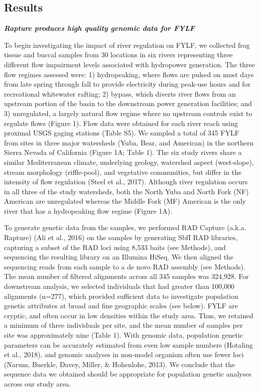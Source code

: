 \documentclass[twoside,12pt,final]{ucthesis-CA2012}
\begin{document}
\begin{ucmainmatter}
\clearpage

\hypertarget{results}{%
\section{Results}\label{results}}

\textbf{\emph{Rapture produces high quality genomic data for FYLF}}

To begin investigating the impact of river regulation on FYLF, we
collected frog tissue and buccal samples from 30 locations in six rivers
representing three different flow impairment levels associated with
hydropower generation. The three flow regimes assessed were: 1)
hydropeaking, where flows are pulsed on most days from late spring
through fall to provide electricity during peak-use hours and for
recreational whitewater rafting; 2) bypass, which diverts river flows
from an upstream portion of the basin to the downstream power generation
facilities; and 3) unregulated, a largely natural flow regime where no
upstream controls exist to regulate flows (Figure 1). Flow data were
obtained for each river reach using proximal USGS gaging stations (Table
S5). We sampled a total of 345 FYLF from sites in three major watersheds
(Yuba, Bear, and American) in the northern Sierra Nevada of California
(Figure 1A; Table 1). The six study rivers share a similar Mediterranean
climate, underlying geology, watershed aspect (west-slope), stream
morphology (riffle-pool), and vegetative communities, but differ in the
intensity of flow regulation (Steel et al., 2017). Although river
regulation occurs in all three of the study watersheds, both the North
Yuba and North Fork (NF) American are unregulated whereas the Middle
Fork (MF) American is the only river that has a hydropeaking flow regime
(Figure 1A).

To generate genetic data from the samples, we performed RAD Capture
(a.k.a. Rapture) (Ali et al., 2016) on the samples by generating SbfI
RAD libraries, capturing a subset of the RAD loci using 8,533 baits (see
Methods), and sequencing the resulting library on an Illumina HiSeq. We
then aligned the sequencing reads from each sample to a de novo RAD
assembly (see Methods). The mean number of filtered alignments across
all 345 samples was 324,928. For downstream analysis, we selected
individuals that had greater than 100,000 alignments (n=277), which
provided sufficient data to investigate population genetic attributes at
broad and fine geographic scales (see below). FYLF are cryptic, and
often occur in low densities within the study area. Thus, we retained a
minimum of three individuals per site, and the mean number of samples
per site was approximately nine (Table 1). With genomic data, population
genetic parameters can be accurately estimated from even low sample
numbers (Hotaling et al., 2018), and genomic analyses in non-model
organism often use fewer loci (Narum, Buerkle, Davey, Miller, \&
Hohenlohe, 2013). We conclude that the sequence data we obtained should
be appropriate for population genetic analyses across our study area.


\end{ucmainmatter}
\end{document}
